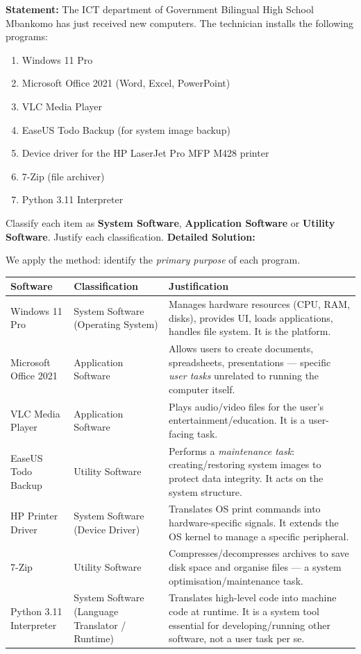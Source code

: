 \documentclass[11pt]{article}
\begin{document}
\begin{exoresolu}
\textbf{Statement:} The ICT department of Government Bilingual High School Mbankomo has just received new computers. The technician installs the following programs:
\begin{enumerate}
    \item Windows 11 Pro
    \item Microsoft Office 2021 (Word, Excel, PowerPoint)
    \item VLC Media Player
    \item EaseUS Todo Backup (for system image backup)
    \item Device driver for the HP LaserJet Pro MFP M428 printer
    \item 7-Zip (file archiver)
    \item Python 3.11 Interpreter
\end{enumerate}
Classify each item as \textbf{System Software}, \textbf{Application Software} or \textbf{Utility Software}. Justify each classification.
\tcblower
\textbf{Detailed Solution:}

We apply the method: identify the \emph{primary purpose} of each program.

\begin{center}
\begin{tabularx}{\linewidth}{|l|X|X|}
\hline
\rowcolor{popblueL}
\textbf{Software} & \textbf{Classification} & \textbf{Justification} \\
\hline
Windows 11 Pro & System Software (Operating System) & Manages hardware resources (CPU, RAM, disks), provides UI, loads applications, handles file system. It is the platform. \\
\hline
Microsoft Office 2021 & Application Software & Allows users to create documents, spreadsheets, presentations — specific \emph{user tasks} unrelated to running the computer itself. \\
\hline
VLC Media Player & Application Software & Plays audio/video files for the user's entertainment/education. It is a user-facing task. \\
\hline
EaseUS Todo Backup & Utility Software & Performs a \emph{maintenance task}: creating/restoring system images to protect data integrity. It acts on the system structure. \\
\hline
HP Printer Driver & System Software (Device Driver) & Translates OS print commands into hardware-specific signals. It extends the OS kernel to manage a specific peripheral. \\
\hline
7-Zip & Utility Software & Compresses/decompresses archives to save disk space and organise files — a system optimisation/maintenance task. \\
\hline
Python 3.11 Interpreter & System Software (Language Translator / Runtime) & Translates high-level code into machine code at runtime. It is a system tool essential for developing/running other software, not a user task per se. \\
\hline
\end{tabularx}
\end{center}


\end{exoresolu}
\end{document}
